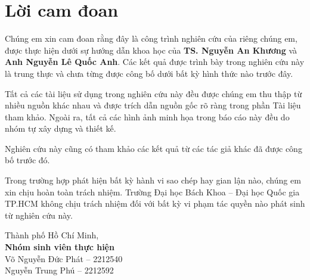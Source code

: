 \chapter*{Lời cam đoan}

Chúng em xin cam đoan rằng đây là công trình nghiên cứu của riêng chúng em, được thực hiện dưới sự hướng dẫn khoa học của \textbf{TS. Nguyễn An Khương} và \textbf{Anh Nguyễn Lê Quốc Anh}. Các kết quả được trình bày trong nghiên cứu này là trung thực và chưa từng được công bố dưới bất kỳ hình thức nào trước đây.

Tất cả các tài liệu sử dụng trong nghiên cứu này đều được chúng em thu thập từ nhiều nguồn khác nhau và được trích dẫn nguồn gốc rõ ràng trong phần Tài liệu tham khảo. Ngoài ra, tất cả các hình ảnh minh họa trong báo cáo này đều do nhóm tự xây dựng và thiết kế.

Nghiên cứu này cũng có tham khảo các kết quả từ các tác giả khác đã được công bố trước đó.

Trong trường hợp phát hiện bất kỳ hành vi sao chép hay gian lận nào, chúng em xin chịu hoàn toàn trách nhiệm. Trường Đại học Bách Khoa – Đại học Quốc gia TP.HCM không chịu trách nhiệm đối với bất kỳ vi phạm tác quyền nào phát sinh từ nghiên cứu này.

\vspace{2cm}
\begin{flushright}
Thành phố Hồ Chí Minh, \SubmitTime{}\\
\vspace{3mm}
\textbf{Nhóm sinh viên thực hiện}\\
\vspace{2mm}
Võ Nguyễn Đức Phát -- 2212540\\
Nguyễn Trung Phú -- 2212592\\

\end{flushright}

